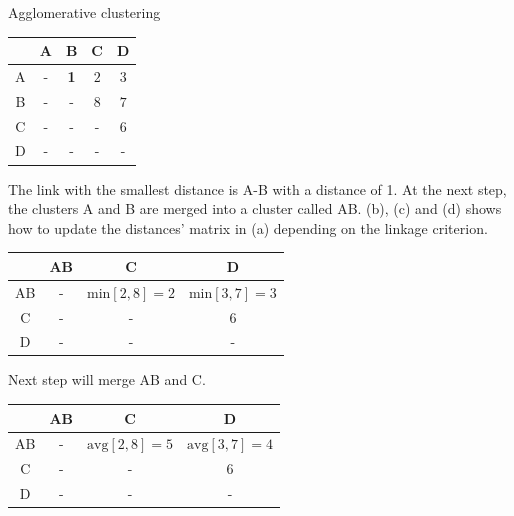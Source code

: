 \begin{example}
  \caption{Agglomerative clustering}
  \label{ex:agglomerative_clustering}

  \begin{subexample}{\linewidth}
    \centering
    \begin{tabular}{c|c c c c}
      \toprule
        & A & B & C & D \\
      \midrule
      A & - & \textbf{1} & $2$ & $3$ \\
      B & - & - & $8$ & $7$\\
      C & - & - & - & $6$ \\
      D & - & - & - & - \\
      \bottomrule
    \end{tabular}
  \end{subexample}

  \vspace{0.2cm}

  The link with the smallest distance is A-B with a distance of 1.
  At the next step, the clusters A and B are merged into a cluster called AB.
  (b), (c) and (d) shows how to update the distances' matrix in (a) depending on the linkage criterion.

  \vspace{0.5cm}

  \begin{subexample}{\linewidth}
    \centering
    \begin{tabular}{c|c c c}
      \toprule
        & AB & C & D \\
      \midrule
      AB & - & $\text{min} \left[2, 8 \right] = 2$ & $\text{min} \left[3, 7 \right] = 3$ \\
      C  & - & - & $6$ \\
      D  & - & - & - \\
      \bottomrule
    \end{tabular}
  \end{subexample}

  \vspace{0.2cm}

  Next step will merge AB and C.

  \vspace{0.5cm}

  \begin{subexample}{\linewidth}
    \centering
    \begin{tabular}{c|c c c}
      \toprule
        & AB & C & D \\
      \midrule
      AB & - & $\text{avg} \left[2, 8 \right] = 5$ & $\text{avg} \left[3, 7 \right] = 4$ \\
      C  & - & - & $6$ \\
      D  & - & - & - \\
      \bottomrule
    \end{tabular}
  \end{subexample}


\end{example}
